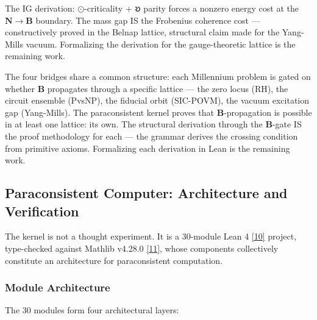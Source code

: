 \documentclass[10pt,a4paper]{article}
\begin{document}
The IG derivation: $\odot$-criticality + 𐑹 parity forces a nonzero energy cost at the $\mathbf{N} \to \mathbf{B}$ boundary. The mass gap IS the Frobenius coherence cost --- constructively proved in the Belnap lattice, structural claim made for the Yang-Mills vacuum. Formalizing the derivation for the gauge-theoretic lattice is the remaining work.

The four bridges share a common structure: each Millennium problem is gated on whether $\mathbf{B}$ propagates through a specific lattice --- the zero locus (RH), the circuit ensemble (PvsNP), the fiducial orbit (SIC-POVM), the vacuum excitation gap (Yang-Mills). The paraconsistent kernel proves that $\mathbf{B}$-propagation is possible in at least one lattice: its own. The structural derivation through the $\mathbf{B}$-gate IS the proof methodology for each --- the grammar derives the crossing condition from primitive axioms. Formalizing each derivation in Lean is the remaining work.

\subsection{Paraconsistent Computer: Architecture and Verification}

The kernel is not a thought experiment. It is a 30-module Lean 4 \href{}{{[}10{]}} project, type-checked against Mathlib v4.28.0 \href{}{{[}11{]}}, whose components collectively constitute an architecture for paraconsistent computation.

\subsubsection{Module Architecture}

The 30 modules form four architectural layers:
\end{document}
